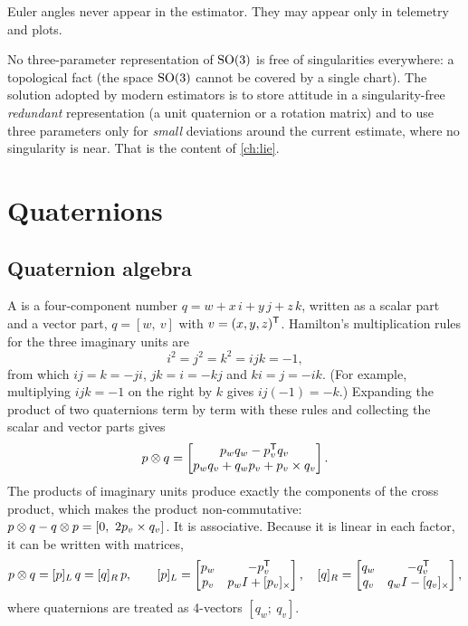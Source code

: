 \begin{convention}[AGENTS.md C2]
Euler angles never appear in the estimator. They may appear only in telemetry and plots.
\end{convention}

No three-parameter representation of $\mathrm{SO}(3)$ is free of singularities everywhere: a topological fact (the space $\mathrm{SO}(3)$ cannot be covered by a
single chart). The solution adopted by modern estimators is to store attitude in a singularity-free \emph{redundant} representation (a unit
quaternion or a rotation matrix) and to use three parameters only for \emph{small} deviations around the current estimate, where no
singularity is near. That is the content of \cref{ch:lie}.

\section{Quaternions}
\label{sec:quaternions}

\subsection{Quaternion algebra}

A  is a four-component number $q = w + x\,i + y\,j + z\,k$, written as a scalar part and a vector part, $q = [w,\ v]$ with
$v = (x,y,z)^{\mathsf{T}}$. Hamilton's multiplication rules for the three imaginary units are
\begin{equation}
  i^2 = j^2 = k^2 = ijk = -1,
\end{equation}
from which $ij = k = -ji$, $jk = i = -kj$ and $ki = j = -ik$. (For example, multiplying $ijk = -1$ on the right by $k$ gives $ij(-1) = -k$.)
Expanding the product of two quaternions term by term with these rules and collecting the scalar and vector parts gives
\begin{equation}
  p \otimes q = \begin{bmatrix} p_w q_w - p_v^{\mathsf{T}} q_v \\ p_w q_v + q_w p_v + p_v \times q_v \end{bmatrix}.
  \label{eq:qprod}
\end{equation}
The products of imaginary units produce exactly the components of the cross product, which makes the product non-commutative:
$p\qprod q - q\qprod p = [0,\ 2p_v\times q_v]$. It is associative. Because it is linear in each factor, it can be written with matrices,
\begin{equation}
  p\otimes q = [p]_L\, q = [q]_R\, p, \qquad
  [p]_L = \begin{bmatrix} p_w & -p_v^{\mathsf{T}} \\ p_v & p_w I + [p_v]_{\times} \end{bmatrix}, \quad
  [q]_R = \begin{bmatrix} q_w & -q_v^{\mathsf{T}} \\ q_v & q_w I - [q_v]_{\times} \end{bmatrix},
\end{equation}
where quaternions are treated as 4-vectors $[q_w;\ q_v]$.

